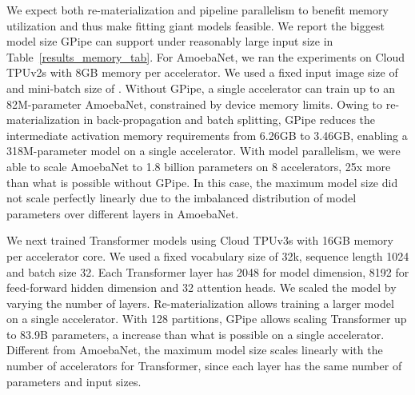 \documentclass{article}
\def\codename{GPipe}
\begin{document}
We expect both re-materialization and pipeline parallelism to benefit memory utilization and thus make fitting giant models feasible. We report the biggest model size \codename{} can support under reasonably large input size in Table~\ref{results_memory_tab}. For AmoebaNet, we ran the experiments on Cloud TPUv2s with 8GB memory per accelerator. We used a fixed input image size of  and mini-batch size of .  Without \codename{}, a single accelerator can train up to an 82M-parameter AmoebaNet, constrained by device memory limits. Owing to re-materialization in back-propagation and batch splitting, \codename{} reduces the intermediate activation memory requirements from 6.26GB to 3.46GB, 
enabling a 318M-parameter model on a single accelerator.  With model parallelism, we were able to scale AmoebaNet to 1.8 billion parameters on 8 accelerators, 25x more than what is possible without \codename{}. In this case, the maximum model size did not scale perfectly linearly due to the imbalanced distribution of model parameters over different layers in AmoebaNet.


We next trained Transformer models using Cloud TPUv3s with 16GB memory per accelerator core. We used a fixed vocabulary size of 32k, sequence length 1024 and batch size 32. Each Transformer layer has 2048 for model dimension, 8192 for feed-forward hidden dimension and 32 attention heads. We scaled the model by varying the number of layers. Re-materialization allows training a  larger model on a single accelerator. With 128 partitions, \codename{} allows scaling Transformer up to 83.9B parameters, a  increase than what is possible on a single accelerator. Different from AmoebaNet, the maximum model size scales linearly with the number of accelerators for Transformer, since each layer has the same number of parameters and input sizes. 
\end{document}
